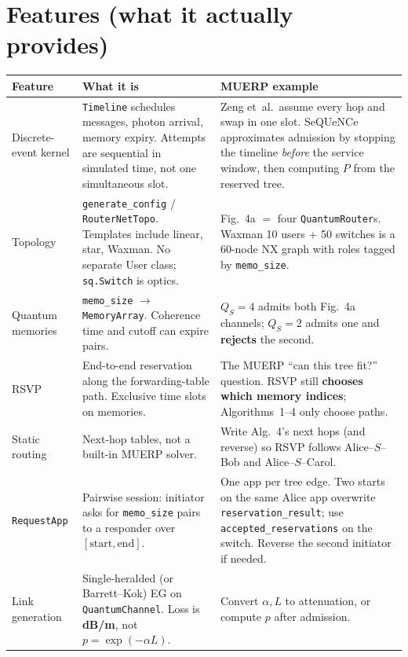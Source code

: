 \documentclass[11pt]{article}
\begin{document}
\section{Features (what it actually provides)}

{\small
\begin{center}
\begin{tabularx}{\textwidth}{@{}P{1.25in} Y Y@{}}
\toprule
Feature & What it is & MUERP example \\
\midrule
Discrete-event kernel
  & \texttt{Timeline} schedules messages, photon arrival, memory expiry.
    Attempts are sequential in simulated time, not one simultaneous slot.
  & Zeng et~al.\ assume every hop and swap in one slot.
    SeQUeNCe approximates admission by stopping the timeline \emph{before} the service window, then computing $P$ from the reserved tree. \\
Topology
  & \texttt{generate\_config} / \texttt{RouterNetTopo}.
    Templates include linear, star, Waxman.
    No separate User class; \texttt{sq.Switch} is optics.
  & Fig.~4a $=$ four \texttt{QuantumRouter}s.
    Waxman 10 users + 50 switches is a 60-node NX graph with roles tagged by \texttt{memo\_size}. \\
Quantum memories
  & \texttt{memo\_size} $\to$ \texttt{MemoryArray}.
    Coherence time and cutoff can expire pairs.
  & $Q_S=4$ admits both Fig.~4a channels; $Q_S=2$ admits one and \textbf{rejects} the second. \\
RSVP
  & End-to-end reservation along the forwarding-table path.
    Exclusive time slots on memories.
  & The MUERP ``can this tree fit?'' question.
    RSVP still \textbf{chooses which memory indices}; Algorithms~1--4 only choose paths. \\
Static routing
  & Next-hop tables, not a built-in MUERP solver.
  & Write Alg.~4's next hops (and reverse) so RSVP follows Alice--$S$--Bob and Alice--$S$--Carol. \\
\texttt{RequestApp}
  & Pairwise session: initiator asks for \texttt{memo\_size} pairs to a responder over $[\mathrm{start},\mathrm{end}]$.
  & One app per tree edge.
    Two starts on the same Alice app overwrite \texttt{reservation\_result}; use \texttt{accepted\_reservations} on the switch.
    Reverse the second initiator if needed. \\
Link generation
  & Single-heralded (or Barrett--Kok) EG on \texttt{QuantumChannel}.
    Loss is \textbf{dB/m}, not $p=\exp(-\alpha L)$.
  & Convert $\alpha,L$ to attenuation, or compute $p$ after admission.

\end{tabularx}
\end{center}}
\end{document}
